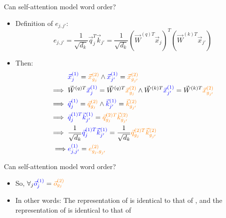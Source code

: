 \documentclass[11pt,compress,t,notes=noshow, xcolor=table]{beamer}
\begin{document}

\begin{vbframe}{Can self-attention model word order?}

\vfill

\begin{itemize}
\item Definition of $e_{j,j'}$:
$$e_{j,j'} = \frac{1}{\sqrt{d_k}} \vec q_{j}^T \vec k_{j'} = \frac{1}{\sqrt{d_k}} (\vec W^{(q)T} \vec x_{j})^T (\vec W^{(k)T} \vec x_{j'})$$
\item Then:
$$
\begin{aligned}
& \textcolor{blue}{\vec x^{(1)}_j} = \textcolor{orange}{\vec x^{(2)}_{g_j}} \land \textcolor{blue}{\vec x^{(1)}_{j'}} = \textcolor{orange}{\vec x^{(2)}_{g_{j'}}} \\
\implies{} & \vec W^{(q)T} \textcolor{blue}{\vec x^{(1)}_j} = \vec W^{(q)T} \textcolor{orange}{\vec x^{(2)}_{g_j}} \land \vec W^{(k)T} \textcolor{blue}{\vec x^{(1)}_{j'}} = \vec W^{(k)T} \textcolor{orange}{\vec x^{(2)}_{g_{j'}}} \\
\implies{} & \textcolor{blue}{\vec q^{(1)}_j} = \textcolor{orange}{\vec q^{(2)}_{g_j}} \land \textcolor{blue}{\vec k^{(1)}_{j'}} = \textcolor{orange}{\vec k^{(2)}_{g_{j'}}} \\
\implies{} & \textcolor{blue}{\vec q^{(1)T}_j \vec k^{(1)}_{j'}} = \textcolor{orange}{\vec q^{(2)T}_{g_j} \vec k^{(2)}_{g_{j'}}} \\
\implies{} & \frac{1}{\sqrt{d_k}} \textcolor{blue}{\vec q^{(1)T}_j \vec k^{(1)}_{j'}} =  \frac{1}{\sqrt{d_k}}  \textcolor{orange}{\vec q^{(2)T}_{g_j} \vec k^{(2)}_{g_{j'}}} \\
\implies & \textcolor{blue}{e^{(1)}_{j,j'}} = \textcolor{orange}{e^{(2)}_{g_j, g_{j'}}}
\end{aligned}
$$
\end{itemize}

\vfill

\end{vbframe}


\begin{vbframe}{Can self-attention model word order?}

\vfill

\begin{itemize}
\item So, $\forall_j \textcolor{blue}{\vec o^{(1)}_j} = \textcolor{orange}{\vec o^{(2)}_{g_j}}$
\item In other words: The representation of  is identical to that of , and the representation of  is identical to that of 
\end{itemize}

\vfill

\end{vbframe}
\end{document}

